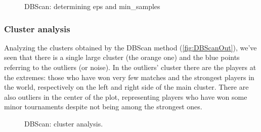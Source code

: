 \begin{figure}[H]
    \centering
    \caption{DBScan: determining eps and min\_samples}
    \label{fig:DBScanDist}
\end{figure}

\subsubsection{Cluster analysis}
Analyzing the clusters obtained by the DBScan method (\autoref{fig:DBScanOut}), we've seen that there is a single large cluster (the orange one) and the blue points referring to the outliers (or noise). In the outliers' cluster there are the players at the extremes: those who have won very few matches and the strongest players in the world, respectively on the left and right side of the main cluster. There are also outliers in the center of the plot, representing players who have won some minor tournaments despite not being among the strongest ones.

\begin{figure}[H]
    \centering
    \caption{DBScan: cluster analysis.}
    \label{fig:DBScanOut}
\end{figure}

